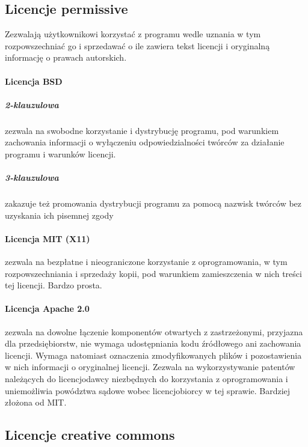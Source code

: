 \documentclass{article}
\begin{document}
\subsection{Licencje permissive}

Zezwalają użytkownikowi korzystać z programu wedle uznania w tym rozpowszechniać go i sprzedawać o ile zawiera tekst licencji i oryginalną informację o prawach autorskich.

\paragraph{Licencja BSD}

\subparagraph{2-klauzulowa}

zezwala na swobodne korzystanie i dystrybucję programu, pod warunkiem zachowania informacji o wyłączeniu odpowiedzialności twórców za działanie programu i warunków licencji.

\subparagraph{3-klauzulowa}

zakazuje też promowania dystrybucji programu za pomocą nazwisk twórców bez uzyskania ich pisemnej zgody

\paragraph{Licencja MIT (X11)}

zezwala na bezpłatne i nieograniczone korzystanie z oprogramowania, w tym rozpowszechniania i sprzedaży kopii, pod warunkiem zamieszczenia w nich treści tej licencji. Bardzo prosta.

\paragraph{Licencja Apache 2.0}

zezwala na dowolne łączenie komponentów otwartych z zastrzeżonymi, przyjazna dla przedsiębiorstw, nie wymaga udostępniania kodu źródłowego ani zachowania licencji. Wymaga natomiast oznaczenia zmodyfikowanych plików i pozostawienia w nich informacji o oryginalnej licencji. Zezwala na wykorzystywanie patentów należących do licencjodawcy niezbędnych do korzystania z oprogramowania i uniemożliwia powództwa sądowe wobec licencjobiorcy w tej sprawie. Bardziej złożona od MIT.

\subsection{Licencje creative commons}
\end{document}
